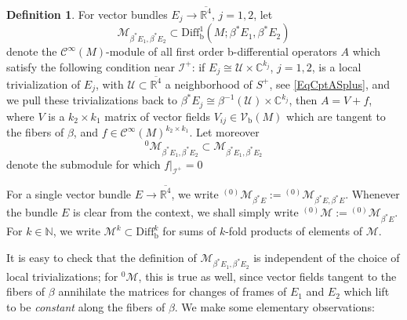 \documentclass[reqno,11pt,letterpaper]{amsart}
\numberwithin{equation}{section}
\numberwithin{figure}{section}
\theoremstyle{definition}
\newtheorem{definition}[thm]{Definition}
\theoremstyle{remark}
\newcommand{\mc}{\mathcal}
\newcommand{\cC}{\mc C}
\newcommand{\cM}{\mc M}
\newcommand{\cU}{\mc U}
\newcommand{\ms}{\mathscr}
\newcommand{\scri}{\ms I}
\newcommand{\C}{\mathbb{C}}
\newcommand{\N}{\mathbb{N}}
\newcommand{\R}{\mathbb{R}}
\newcommand{\ol}{\overline}
\newcommand{\bop}{{\mathrm{b}}}
\newcommand{\Diff}{\mathrm{Diff}}
\newcommand{\Vf}{\mathcal V}
\newcommand{\Vb}{\Vf_\bop}
\newcommand{\Diffb}{\Diff_\bop}
\newcommand{\CI}{\cC^\infty}
\begin{document}
\begin{definition}
\label{DefCptScriModule}
  For vector bundles $E_j\to\ol{\R^4}$, $j=1,2$, let
  \[
    \cM_{\beta^*E_1,\beta^*E_2} \subset \Diffb^1(M;\beta^*E_1,\beta^*E_2)
  \]
  denote the $\CI(M)$-module of all first order b-differential operators $A$ which satisfy the following condition near $\scri^+$: if $E_j\cong\cU\times\C^{k_j}$, $j=1,2$, is a local trivialization of $E_j$, with $\cU\subset\ol{\R^4}$ a neighborhood of $S^+$, see \eqref{EqCptASplus}, and we pull these trivializations back to $\beta^*E_j\cong\beta^{-1}(\cU)\times\C^{k_j}$, then $A=V+f$, where $V$ is a $k_2\times k_1$ matrix of vector fields $V_{i j}\in\Vb(M)$ which are tangent to the fibers of $\beta$, and $f\in\CI(M)^{k_2\times k_1}$. Let moreover
  \[
    {}^0\cM_{\beta^*E_1,\beta^*E_2}\subset\cM_{\beta^*E_1,\beta^*E_2}
  \]
  denote the submodule for which $f|_{\scri^+}=0$

  For a single vector bundle $E\to\ol{\R^4}$, we write ${}^{(0)}\cM_{\beta^*E}:={}^{(0)}\cM_{\beta^*E,\beta^*E}$. Whenever the bundle $E$ is clear from the context, we shall simply write ${}^{(0)}\cM:={}^{(0)}\cM_{\beta^*E}$. For $k\in\N$, we write $\cM^k\subset\Diffb^k$ for sums of $k$-fold products of elements of $\cM$.
\end{definition}

It is easy to check that the definition of $\cM_{\beta^*E_1,\beta^*E_2}$ is independent of the choice of local trivializations; for ${}^0\cM$, this is true as well, since vector fields tangent to the fibers of $\beta$ annihilate the matrices for changes of frames of $E_1$ and $E_2$ which lift to be \emph{constant} along the fibers of $\beta$. We make some elementary observations:
\end{document}
